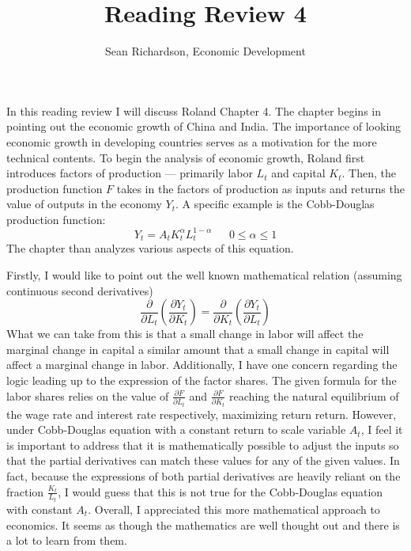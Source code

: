 \documentclass[12pt]{amsart}
\newcommand{\pder}[2]{\frac{\partial#1}{\partial#2}}
\begin{document}
\title{Reading Review 4}
\author{Sean Richardson, Economic Development}
\maketitle

In this reading review I will discuss Roland Chapter 4. The chapter begins
in pointing out the economic growth of China and India. The importance of
looking economic growth in developing countries serves as a motivation for
the more technical contents. To begin the analysis of economic growth,
Roland first introduces factors of production --- primarily labor $L_t$ and
capital $K_t$. Then, the production function $F$ takes in the factors of
production as inputs and returns the value of outputs in the economy $Y_t$. A
specific example is the Cobb-Douglas production function:
\begin{equation}
    Y_t = A_t K_t^\alpha L_t^{1-\alpha} \ \ \ \ \ \ \ 0 \leq \alpha \leq 1
    \tag{Cobb-Douglas}
\end{equation}
The chapter than analyzes various aspects of this equation.

Firstly, I would like to point out the well known mathematical relation
(assuming continuous second derivatives)
\begin{equation*}
    \pder{}{L_t}\left(\pder{Y_t}{K_t}\right) = 
    \pder{}{K_t}\left(\pder{Y_t}{L_t}\right)
\end{equation*}
What we can take from this is that a small change in labor will affect the
marginal change in capital a similar amount that a small change in capital
will affect a marginal change in labor.
Additionally, I have one concern regarding the logic leading up to the
expression of the factor shares. The given formula for the labor shares
relies on the value of $\pder{F}{L_t}$ and $\pder{F}{K_t}$ reaching the
natural equilibrium of the wage rate and interest rate respectively,
maximizing return return. However, under Cobb-Douglas
equation with a constant return to scale variable $A_t$, I feel it is
important to address that it is mathematically possible to adjust the
inputs so that the partial derivatives can match these values for any of
the given values. In fact, because the expressions of both partial
derivatives are heavily reliant on the fraction $\frac{K_t}{L_t}$, I would
guess that this is not true for the Cobb-Douglas equation with constant
$A_t$. Overall, I appreciated this more mathematical approach to economics.
It seems as though the mathematics are well thought out and there is a lot
to learn from them.
\end{document}
